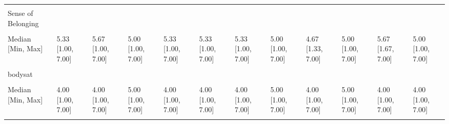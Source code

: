 \documentclass[
  single column]{article}
\begin{document}
\begin{landscape}
\begin{longtable}[t]{llllllllllll}
\endfoot
\bottomrule
\endlastfoot
\cellcolor{gray!10}{} & \cellcolor{gray!10}{(N=21551)} & \cellcolor{gray!10}{(N=1363)} & \cellcolor{gray!10}{(N=270)} & \cellcolor{gray!10}{(N=2017)} & \cellcolor{gray!10}{(N=3696)} & \cellcolor{gray!10}{(N=1095)} & \cellcolor{gray!10}{(N=136)} & \cellcolor{gray!10}{(N=87)} & \cellcolor{gray!10}{(N=658)} & \cellcolor{gray!10}{(N=576)} & \cellcolor{gray!10}{(N=744)}\\
Sense of Belonging &  &  &  &  &  &  &  &  &  &  & \\
\cellcolor{gray!10}{Mean (SD)} & \cellcolor{gray!10}{5.11 (1.14)} & \cellcolor{gray!10}{5.37 (1.05)} & \cellcolor{gray!10}{4.99 (1.24)} & \cellcolor{gray!10}{5.26 (1.11)} & \cellcolor{gray!10}{5.19 (1.13)} & \cellcolor{gray!10}{5.23 (1.15)} & \cellcolor{gray!10}{4.99 (1.21)} & \cellcolor{gray!10}{4.65 (1.16)} & \cellcolor{gray!10}{4.83 (1.21)} & \cellcolor{gray!10}{5.38 (1.03)} & \cellcolor{gray!10}{4.84 (1.30)}\\
Median [Min, Max] & 5.33 [1.00, 7.00] & 5.67 [1.00, 7.00] & 5.00 [1.00, 7.00] & 5.33 [1.00, 7.00] & 5.33 [1.00, 7.00] & 5.33 [1.00, 7.00] & 5.00 [1.00, 7.00] & 4.67 [1.33, 7.00] & 5.00 [1.00, 7.00] & 5.67 [1.67, 7.00] & 5.00 [1.00, 7.00]\\
\cellcolor{gray!10}{Missing} & \cellcolor{gray!10}{103 (0.5\%)} & \cellcolor{gray!10}{11 (0.8\%)} & \cellcolor{gray!10}{2 (0.7\%)} & \cellcolor{gray!10}{11 (0.5\%)} & \cellcolor{gray!10}{23 (0.6\%)} & \cellcolor{gray!10}{3 (0.3\%)} & \cellcolor{gray!10}{0 (0\%)} & \cellcolor{gray!10}{2 (2.3\%)} & \cellcolor{gray!10}{3 (0.5\%)} & \cellcolor{gray!10}{1 (0.2\%)} & \cellcolor{gray!10}{7 (0.9\%)}\\
\addlinespace
bodysat &  &  &  &  &  &  &  &  &  &  & \\
\cellcolor{gray!10}{Mean (SD)} & \cellcolor{gray!10}{4.10 (1.72)} & \cellcolor{gray!10}{4.24 (1.68)} & \cellcolor{gray!10}{4.46 (1.66)} & \cellcolor{gray!10}{4.21 (1.72)} & \cellcolor{gray!10}{4.22 (1.71)} & \cellcolor{gray!10}{4.14 (1.75)} & \cellcolor{gray!10}{4.39 (1.83)} & \cellcolor{gray!10}{3.85 (1.79)} & \cellcolor{gray!10}{4.65 (1.84)} & \cellcolor{gray!10}{4.14 (1.73)} & \cellcolor{gray!10}{4.17 (1.81)}\\
Median [Min, Max] & 4.00 [1.00, 7.00] & 4.00 [1.00, 7.00] & 5.00 [1.00, 7.00] & 4.00 [1.00, 7.00] & 4.00 [1.00, 7.00] & 4.00 [1.00, 7.00] & 5.00 [1.00, 7.00] & 4.00 [1.00, 7.00] & 5.00 [1.00, 7.00] & 4.00 [1.00, 7.00] & 4.00 [1.00, 7.00]\\
\cellcolor{gray!10}{Missing} & \cellcolor{gray!10}{1181 (5.5\%)} & \cellcolor{gray!10}{55 (4.0\%)} & \cellcolor{gray!10}{14 (5.2\%)} & \cellcolor{gray!10}{97 (4.8\%)} & \cellcolor{gray!10}{196 (5.3\%)} & \cellcolor{gray!10}{60 (5.5\%)} & \cellcolor{gray!10}{9 (6.6\%)} & \cellcolor{gray!10}{5 (5.7\%)} & \cellcolor{gray!10}{11 (1.7\%)} & \cellcolor{gray!10}{22 (3.8\%)} & \cellcolor{gray!10}{43 (5.8\%)}\\

\end{longtable}
\end{landscape}
\end{document}
